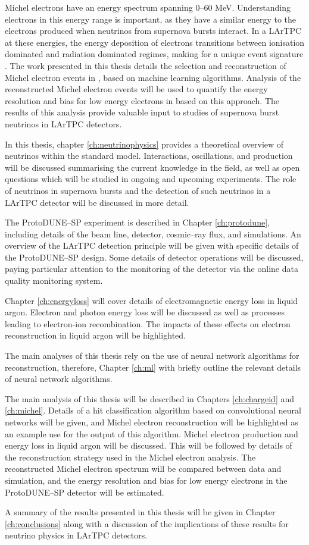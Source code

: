 Michel electrons have an energy spectrum spanning 0--60 MeV. Understanding
electrons in this energy range is important, as they have a similar energy to 
the electrons produced when neutrinos from supernova bursts interact. In a 
LArTPC at these energies, the energy deposition of electrons transitions 
between ionisation dominated and radiation dominated regimes, making for a 
unique event signature \cite{Acciarri:2017sjy}. The work presented in this 
thesis details the selection and reconstruction of Michel electron events in 
\protodune{}, based on machine learning algorithms. Analysis of the 
reconstructed Michel electron events will be used to quantify the energy 
resolution and bias for low energy electrons in \protodune{} based on this 
approach. The results of this analysis provide valuable input to studies of 
supernova burst neutrinos in LArTPC detectors.

In this thesis, chapter \ref{ch:neutrinophysics} provides a theoretical 
overview of neutrinos within the standard model. Interactions, oscillations, 
and production will be discussed summarising the current knowledge in the 
field, as well as open questions which will be studied in ongoing and upcoming 
experiments. The role of neutrinos in supernova bursts and the detection of 
such neutrinos in a LArTPC detector will be discussed in more detail.

The ProtoDUNE--SP experiment is described in Chapter \ref{ch:protodune},
including details of the beam line, detector, cosmic--ray flux, and simulations.
An overview of the LArTPC detection principle will be given with specific
details of the ProtoDUNE--SP design. Some details of detector operations will be
discussed, paying particular attention to the monitoring of the detector via the
online data quality monitoring system.

Chapter \ref{ch:energyloss} will cover details of electromagnetic energy loss
in liquid argon. Electron and photon energy loss will be discussed as well as
processes leading to electron-ion recombination. The impacts of these effects on
electron reconstruction in liquid argon will be highlighted.

The main analyses of this thesis rely on the use of neural network algorithms
for reconstruction, therefore, Chapter \ref{ch:ml} with briefly outline the
relevant details of neural network algorithms.

The main analysis of this thesis will be described in Chapters
\ref{ch:chargeid} and \ref{ch:michel}. Details of a hit classification
algorithm based on convolutional neural networks will be given, and Michel
electron reconstruction will be highlighted as an example use for the output of
this algorithm. Michel electron production and energy loss in liquid argon will
be discussed. This will be followed by details of the reconstruction strategy
used in the Michel electron analysis. The reconstructed Michel electron spectrum
will be compared between data and simulation, and the energy resolution and 
bias for low energy electrons in the ProtoDUNE--SP detector will be estimated. 

A summary of the results presented in this thesis will be given in Chapter
\ref{ch:conclusions} along with a discussion of the implications of these
results for neutrino physics in LArTPC detectors.
